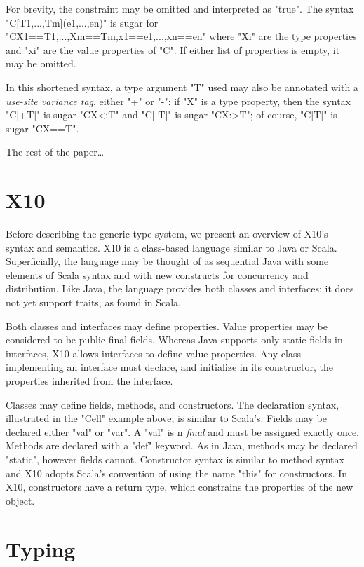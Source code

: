 \documentclass[preprint,nocopyrightspace,9pt]{sigplanconf}
\begin{document}
For brevity, the constraint may be omitted and
interpreted as \xcd"true".
The syntax
\xcd"C[T1,...,Tm](e1,...,en)" is sugar for
\xcd"C{X1==T1,...,Xm==Tm,x1==e1,...,xn==en}"
where \xcd"Xi" are the type properties and \xcd"xi" are the
value properties of \xcd"C".
If either list of properties is empty, it may be omitted.

In this shortened syntax, a type argument \xcd"T" used may also be annotated
with
a \emph{use-site variance tag}, either \xcd"+" or \xcd"-":
if \xcd"X" is a type property, then
the syntax \xcd"C[+T]" is sugar \xcd"C{X<:T}" and
\xcd"C[-T]" is sugar \xcd"C{X:>T}"; of course,
\xcd"C[T]" is sugar \xcd"C{X==T}".

The rest of the paper\dots

\section{X10}

Before describing the generic type system, we present an
overview of X10's syntax and semantics.
X10 is a class-based language similar to Java or Scala.
Superficially, the language may be thought of as sequential
Java with some elements of Scala syntax and with new constructs
for concurrency and distribution.
Like Java, the language provides both classes and interfaces; it does not
yet support traits, as found in Scala.

Both classes and interfaces may define properties. Value
properties may be considered to be public final fields. Whereas
Java supports only static fields in interfaces, X10
allows interfaces to define value properties. Any class implementing
an interface must declare, and initialize in its
constructor,
the properties inherited from the interface.

Classes may define fields, methods, and constructors. The
declaration syntax,
illustrated in the \xcd"Cell" example
above,
is similar to Scala's.  Fields may be
declared either \xcd"val" or \xcd"var".  A \xcd"val" is n
\emph{final} and must be assigned exactly once.  Methods are
declared with a \xcd"def" keyword.
As in Java, methods may be declared \xcd"static", however fields cannot.
Constructor syntax is
similar to method syntax and X10 adopts Scala's convention of
using the name \xcd"this" for constructors.
In X10, constructors have a return type, which constrains
the properties of the new object.

\section{Typing}
\end{document}

